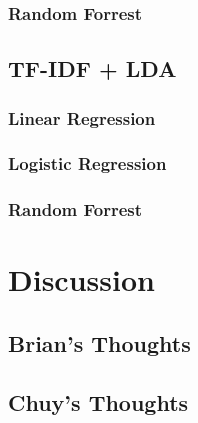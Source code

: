 \documentclass[11pt]{article}
\begin{document}
\subsubsection{Random Forrest}

\subsection{TF-IDF + LDA}
\label{sec:tfidf_lda}

\subsubsection{Linear Regression}

\subsubsection{Logistic Regression}

\subsubsection{Random Forrest}

\section{Discussion}
\label{sec:discussion}

\subsection{Brian's Thoughts}

\subsection{Chuy's Thoughts}

{}

\end{document}

